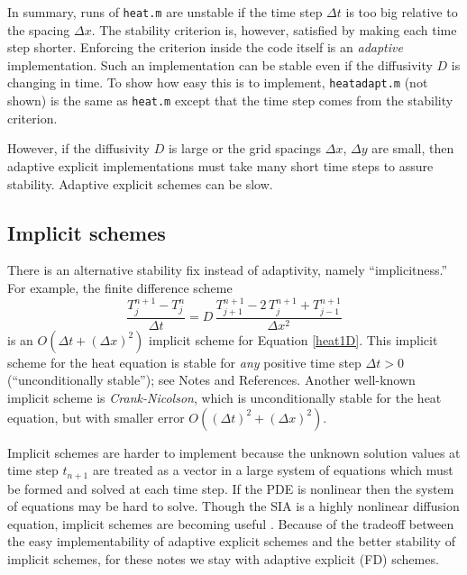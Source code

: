 \documentclass[letterpaper,final,12pt,reqno]{amsart}
\begin{document}
In summary, runs of \texttt{heat.m} are unstable if the time step $\Delta t$ is too big relative to the spacing $\Delta x$.  The stability criterion is, however, satisfied by making each time step shorter.  Enforcing the criterion inside the code itself is an \emph{adaptive} implementation.  Such an implementation can be stable even if the diffusivity $D$ is changing in time.  To show how easy this is to implement, \texttt{heatadapt.m} (not shown) is the same as \texttt{heat.m} except that the time step comes from the stability criterion.

However, if the diffusivity $D$ is large or the grid spacings $\Delta x$, $\Delta y$ are small, then adaptive explicit implementations must take many short time steps to assure stability.  Adaptive explicit schemes can be slow.

\subsection*{Implicit schemes}  There is an alternative stability fix instead of adaptivity, namely ``implicitness.''  For example, the finite difference scheme
\begin{equation}
  \frac{T_j^{n+1} - T_j^n}{\Delta t} = D\,\frac{T_{j+1}^{n+1} - 2\, T_j^{n+1} + T_{j-1}^{n+1}}{\Delta x^2} \label{implicit1D}
\end{equation}
is an $O(\Delta t + (\Delta x)^2)$ implicit scheme for Equation \eqref{heat1D}.  This implicit scheme for the heat equation is stable for \emph{any} positive time step $\Delta t>0$ (``unconditionally stable''); see Notes and References.  Another well-known implicit scheme is \emph{Crank-Nicolson}, which is unconditionally stable for the heat equation, but with smaller error $O((\Delta t)^2 +(\Delta x)^2)$.

Implicit schemes are harder to implement because the unknown solution values at time step $t_{n+1}$ are treated as a vector in a large system of equations which must be formed and solved at each time step.  If the PDE is nonlinear then the system of equations may be hard to solve.  Though the SIA is a highly nonlinear diffusion equation, implicit schemes are becoming useful \cite{Bueler2016}.  Because of the tradeoff between the easy implementability of adaptive explicit schemes and the better stability of implicit schemes, for these notes we stay with adaptive explicit (FD) schemes.
\end{document}
